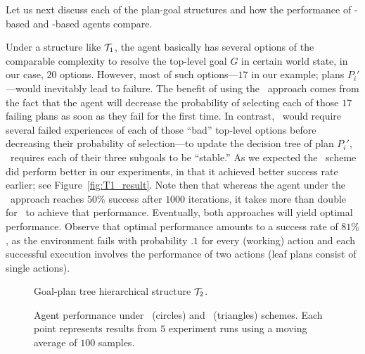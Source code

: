 Let us next discuss each of the plan-goal structures and how the performance of
\BUL-based and \CL-based agents compare.


Under a structure like $\T_1$, the agent basically has several options of the
comparable complexity to resolve the top-level goal $G$ in certain world state,
in our case, $20$ options. However, most of such options---$17$ in our example;
plans $P_i'$---would inevitably lead to failure.
The benefit of using the \CL\ approach comes from the fact that the agent will
decrease the probability of selecting each of those $17$ failing plans as soon as
they fail for the first time. In contrast, \BUL\ would require several failed
experiences of each of those ``bad'' top-level options before decreasing their
probability of selection---to update the decision tree of plan $P_i'$, \BUL\
requires each of their three subgoals to be ``stable.''
As we expected the \CL\ scheme did perform better in our experiments, in that it
achieved better success rate earlier; see Figure~\ref{fig:T1_result}.
Note then that whereas the agent under the \CL\ approach reaches $50\%$ success
after $1000$ iterations, it takes more than double for \BUL\ to achieve that
performance.
Eventually, both approaches will yield optimal performance. Observe that optimal
performance amounts to a success rate of $81\%$, as the environment fails with
probability $.1$ for every (working) action and each successful execution
involves the performance of two actions (leaf plans consist of single actions).


\begin{figure}[t]
\begin{center}

\end{center}
\caption{Goal-plan tree hierarchical structure $\T_2$.}
\label{fig:T2}
\end{figure}


\begin{figure*}[t]
\begin{center}
\subfigure[Structure $\T_1$]{\label{fig:T1_result}

}
\qquad
\subfigure[Structure $\T_2$]{\label{fig:T2_result}

}
\qquad
\subfigure[Structure $\T_3$]{\label{fig:T3_result}

}
\caption{Agent performance under \BUL\ (circles) and \CL\ (triangles) schemes.
Each point represents results from $5$ experiment runs using a moving average of $100$ samples.}
\end{center}
\end{figure*}


